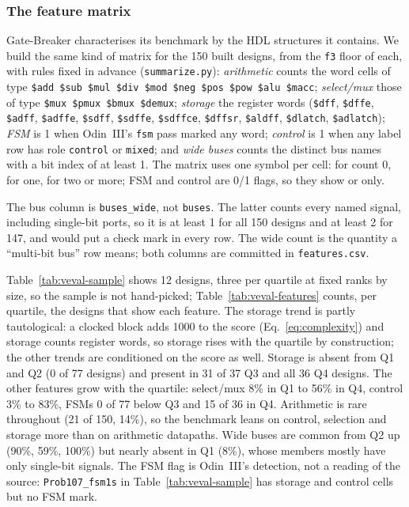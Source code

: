 \documentclass[conference]{IEEEtran}
\newcommand{\code}[1]{\texttt{#1}}
\begin{document}
\subsubsection{The feature matrix}
\label{sec:veval-features}

Gate-Breaker characterises its benchmark by the HDL structures it contains. We build the
same kind of matrix for the 150 built designs, from the \code{f3} floor of each, with
rules fixed in advance (\code{summarize.py}):
\emph{arithmetic} counts the word cells of type \code{\$add \$sub \$mul \$div \$mod \$neg
\$pos \$pow \$alu \$macc}; \emph{select/mux} those of type \code{\$mux \$pmux \$bmux \$demux};
\emph{storage} the register words (\code{\$dff}, \code{\$dffe}, \code{\$adff}, \code{\$adffe},
\code{\$sdff}, \code{\$sdffe}, \code{\$sdffce}, \code{\$dffsr}, \code{\$aldff},
\code{\$dlatch}, \code{\$adlatch}); \emph{FSM} is 1 when Odin~III's \code{fsm} pass marked any
word; \emph{control} is 1 when any label row has role \code{control} or \code{mixed}; and
\emph{wide buses} counts the distinct bus names with a bit index of at least 1. The matrix
uses one symbol per cell:  for count 0,  for one,  for
two or more; FSM and control are 0/1 flags, so they show  or  only.

The bus column is \code{buses\_wide}, not \code{buses}. The latter counts every named signal,
including single-bit ports, so it is at least 1 for all 150 designs and at least 2 for 147,
and would put a check mark in every row. The wide count is the quantity a ``multi-bit bus''
row means; both columns are committed in \code{features.csv}.

Table~\ref{tab:veval-sample} shows 12 designs, three per quartile at fixed ranks by size, so
the sample is not hand-picked; Table~\ref{tab:veval-features} counts, per quartile, the
designs that show each feature. The storage trend is partly tautological: a clocked block adds 1000 to the score
(Eq.~\ref{eq:complexity}) and storage counts register words, so storage rises with the quartile
by construction; the other trends are conditioned on the score as well. Storage is absent from Q1 and Q2 (0 of 77 designs) and present in 31 of 37 Q3 and all 36 Q4
designs. The other features grow with the quartile: select/mux 8\% in Q1 to 56\% in Q4, control
3\% to 83\%, FSMs 0 of 77 below Q3 and 15 of 36 in Q4. Arithmetic is rare throughout (21 of
150, 14\%), so the benchmark leans on control, selection and storage more than on arithmetic
datapaths. Wide buses are common from Q2 up (90\%, 59\%, 100\%) but nearly absent in Q1
(8\%), whose members mostly have only single-bit signals. The FSM flag is Odin~III's detection, not a
reading of the source: \code{Prob107\_fsm1s} in Table~\ref{tab:veval-sample} has storage
and control cells but no FSM mark.
\end{document}
